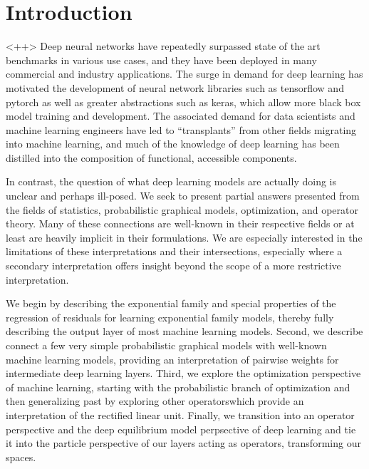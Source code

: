 \documentclass[a4paper]{article}
\begin{document}
\section{Introduction}<++>
	Deep neural networks have repeatedly surpassed state of the art benchmarks in various use cases, and they have been deployed in many commercial and industry applications. 
The surge in demand for deep learning has motivated the development of neural network libraries such as tensorflow and pytorch as well as greater abstractions such as keras, which allow more black box model training and development. 
The associated demand for data scientists and machine learning engineers have led to ``transplants'' from other fields migrating into machine learning, and much of the knowledge of deep learning has been distilled into the composition of functional, accessible components. 

	In contrast, the question of what deep learning models are actually doing is unclear and perhaps ill-posed.
We seek to present partial answers presented from the fields of statistics, probabilistic graphical models, optimization, and operator theory. 
Many of these connections are well-known in their respective fields or at least are heavily implicit in their formulations.
We are especially interested in the limitations of these interpretations and their intersections, especially where a secondary interpretation offers insight beyond the scope of a more restrictive interpretation.

	We begin by describing the exponential family and special properties of the regression of residuals for learning exponential family models, thereby fully describing the output layer of most machine learning models. 
Second, we describe connect a few very simple probabilistic graphical models with well-known machine learning models, providing an interpretation of pairwise weights for intermediate deep learning layers. 
Third, we explore the optimization perspective of machine learning, starting with the probabilistic branch of optimization and then generalizing past by exploring other operatorswhich provide an interpretation of the rectified linear unit. 
Finally, we transition into an operator perspective and the deep equilibrium model perpsective of deep learning and tie it into the particle perspective of our layers acting as operators, transforming our spaces.
\end{document}
